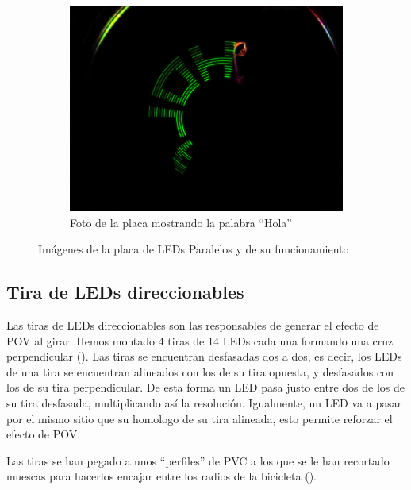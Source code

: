 \begin{figure}[!ht]
\begin{subfigure}[t]{0.3\textwidth}
		\includegraphics[width=\textwidth]{images/ledsParalelos-hola}
		\caption{Foto de la placa mostrando la palabra ``Hola''}
		\label{fig:ledsParalelos-hola}
	\end{subfigure}

	\caption{Imágenes de la placa de LEDs Paralelos y de su funcionamiento}
	\label{fig:ledsParalelos}
\end{figure}

\newpage
\subsection{Tira de LEDs direccionables}
\label{sec:leds_direccionables}
Las tiras de LEDs direccionables son las responsables de generar el efecto de
POV al girar. Hemos montado 4 tiras de 14 LEDs cada una formando una cruz
perpendicular (). Las tiras se encuentran desfasadas dos
a dos, es decir, los LEDs de una tira se encuentran alineados con los de su tira
opuesta, y desfasados con los de su tira perpendicular. De esta forma un LED
pasa justo entre dos de los de su tira desfasada, multiplicando así la
resolución. Igualmente, un LED va a pasar por el mismo sitio que su homologo de
su tira alineada, esto permite reforzar el efecto de POV.

Las tiras se han pegado a unos ``perfiles'' de PVC a los que se le han recortado
muescas para hacerlos encajar entre los radios de la bicicleta
().

